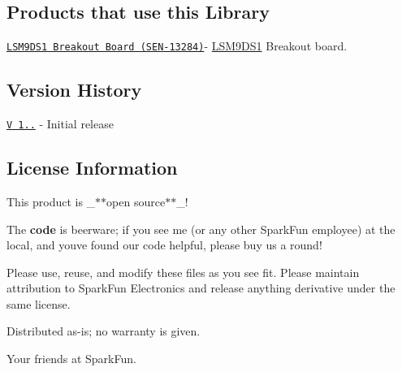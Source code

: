 \subsection*{Products that use this Library }


\begin{DoxyItemize}
\item \href{https://www.sparkfun.com/products/13284}{\tt L\+S\+M9\+D\+S1 Breakout Board (S\+E\+N-\/13284)}-\/ \hyperlink{class_l_s_m9_d_s1}{L\+S\+M9\+D\+S1} Breakout board.
\end{DoxyItemize}

\subsection*{Version History }


\begin{DoxyItemize}
\item \href{https://github.com/sparkfun/SparkFun_LSM9DS1_Arduino_Library/releases/tag/V_1.0.0}{\tt V 1..} -\/ Initial release
\end{DoxyItemize}

\subsection*{License Information }

This product is \+\_\+$\ast$$\ast$open source$\ast$$\ast$\+\_\+!

The {\bfseries code} is beerware; if you see me (or any other Spark\+Fun employee) at the local, and you\textquotesingle{}ve found our code helpful, please buy us a round!

Please use, reuse, and modify these files as you see fit. Please maintain attribution to Spark\+Fun Electronics and release anything derivative under the same license.

Distributed as-\/is; no warranty is given.


\begin{DoxyItemize}
\item Your friends at Spark\+Fun. 
\end{DoxyItemize}
